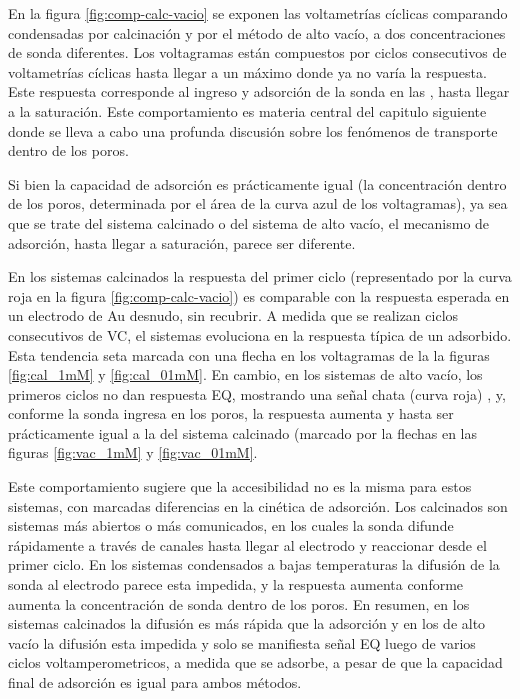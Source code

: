 	  En la figura \ref{fig:comp-calc-vacio} se exponen las voltametrías cíclicas comparando \pdmF\space condensadas por calcinación y por el método de alto vacío, a dos concentraciones de sonda diferentes. Los voltagramas están compuestos por ciclos consecutivos de voltametrías cíclicas hasta llegar a un máximo donde ya no varía la respuesta. Este respuesta corresponde al ingreso y adsorción de la sonda en las \pdm, hasta llegar a la saturación. Este comportamiento es materia central del capitulo siguiente donde se lleva a cabo una profunda discusión sobre los fenómenos de transporte dentro de los poros.

      Si bien la capacidad de adsorción es prácticamente igual (la concentración dentro de los poros, determinada por el área de la curva azul de los voltagramas), ya sea que se trate del sistema calcinado o del sistema de alto vacío, el mecanismo de adsorción, hasta llegar a saturación, parece ser diferente. 

      En los sistemas calcinados la respuesta del primer ciclo (representado por la curva roja en la figura \ref{fig:comp-calc-vacio}) es comparable con la respuesta esperada en un electrodo de Au desnudo, sin recubrir. A medida que se realizan ciclos consecutivos de VC, el sistemas evoluciona en la respuesta típica de un adsorbido. Esta tendencia seta marcada con una flecha en los voltagramas de la la figuras \ref{fig:cal_1mM} y \ref{fig:cal_01mM}. En cambio, en los sistemas de alto vacío, los primeros ciclos no dan respuesta EQ, mostrando una señal chata (curva roja) , y, conforme la sonda ingresa en los poros, la respuesta aumenta y hasta ser prácticamente igual a la del sistema calcinado (marcado por la flechas en las figuras \ref{fig:vac_1mM} y \ref{fig:vac_01mM}. 

      Este comportamiento sugiere que la accesibilidad no es la misma para estos sistemas, con marcadas diferencias en la cinética de adsorción. Los calcinados son sistemas más abiertos o más comunicados, en los cuales la sonda difunde rápidamente a través de canales hasta llegar al electrodo y reaccionar desde el primer ciclo. En los sistemas condensados a bajas temperaturas la difusión de la sonda al electrodo parece esta impedida, y la respuesta aumenta conforme aumenta la concentración de sonda dentro de los poros. En resumen, en los sistemas calcinados la difusión es más rápida que la adsorción y en los de alto vacío la difusión esta impedida y solo se manifiesta señal EQ luego de varios ciclos voltamperometricos, a medida que se adsorbe, a pesar de que la capacidad final de adsorción es igual para ambos métodos.

